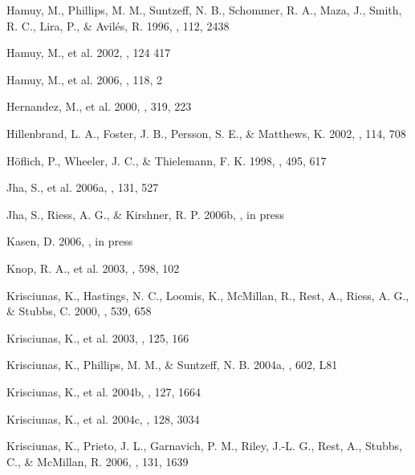 \documentclass[12pt,preprint,psfig,epsf]{aastex}
\begin{document}
\begin{thebibliography}{}
%
 Hamuy, M., Phillips, M. M., 
Suntzeff, N. B., Schommer, R. A., Maza, J., Smith, R. C., Lira, P.,
\& Avil\'{e}s, R. 1996, \aj, 112, 2438

 Hamuy, M., et al. 2002,
\aj, 124 417

 Hamuy, M., et al. 2006, \pasp, 
118, 2

 Hernandez, M., et al. 2000,
\mnras, 319, 223

 Hillenbrand, L. A.,
Foster, J. B., Persson, S. E., \& Matthews, K. 2002, \pasp, 114, 708  

 H\"{o}flich, P.,
Wheeler, J. C., \& Thielemann, F. K. 1998, \apj, 495, 617

 Jha, S., et al. 2006a, \aj,
131, 527

 Jha, S., Riess, A. G., 
\& Kirshner, R. P. 2006b, \apj, in press

 Kasen, D. 2006, \apj, in press

 Knop, R. A., et al. 2003, \apj, 598, 102

 Krisciunas, K., Hastings, N. C., 
Loomis, K., McMillan, R., Rest, A., Riess, A. G., \& Stubbs, C. 2000, 
\apj, 539, 658


 Krisciunas, K., et al. 2003, \aj, 125, 166 

 Krisciunas,
  K., Phillips, M. M., \& Suntzeff, N. B. 2004a, \apjl, 602, L81

 Krisciunas, K., et al. 2004b, \aj, 127, 1664

 Krisciunas, K., et al. 2004c, \aj, 128, 3034

 Krisciunas, K., Prieto, J. L.,
Garnavich, P. M., Riley, J.-L. G., Rest, A., Stubbs, C., \& McMillan, R. 2006,
\aj, 131, 1639


\end{thebibliography}
\end{document}
